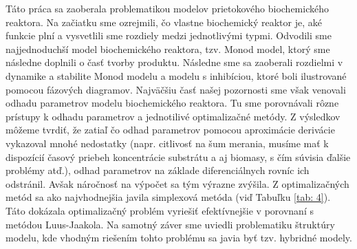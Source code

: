 Táto práca sa zaoberala problematikou modelov prietokového biochemického reaktora. Na začiatku sme ozrejmili, čo vlastne biochemický reaktor je, aké funkcie plní a vysvetlili sme rozdiely medzi jednotlivými typmi. Odvodili sme najjednoduchší model biochemického reaktora, tzv. Monod model, ktorý sme následne doplnili o časť tvorby produktu. Následne sme sa zaoberali rozdielmi v dynamike a stabilite Monod modelu a modelu s inhibíciou, ktoré boli ilustrované pomocou fázových diagramov. Najväčšiu časť našej pozornosti sme však venovali odhadu parametrov modelu biochemického reaktora. Tu sme porovnávali rôzne prístupy k odhadu parametrov a jednotilivé optimalizačné metódy.
Z výsledkov môžeme tvrdiť, že zatiaľ čo odhad parametrov pomocou aproximácie derivácie vykazoval mnohé nedostatky (napr. citlivosť na šum merania, musíme mať k dispozícií časový priebeh koncentrácie substrátu a aj biomasy, s čím súvisia ďalšie problémy atď.), odhad parametrov na základe diferenciálnych rovníc ich odstránil. Avšak náročnosť na výpočet sa tým výrazne zvýšila. Z optimalizačných metód sa ako najvhodnejšia javila simplexová metóda (viď Tabuľku \ref{tab: 4}). Táto dokázala optimalizačný problém vyriešiť efektívnejšie v porovnaní s metódou Luus-Jaakola. Na samotný záver sme uviedli problematiku štruktúry modelu, kde vhodným riešením tohto problému sa javia byť tzv. hybridné modely. 
